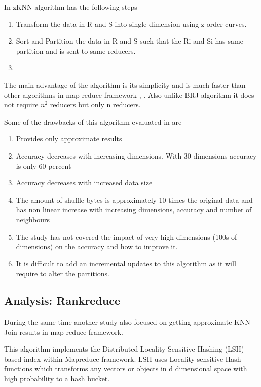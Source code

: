 \documentclass[conference]{IEEEtran}
\begin{document}
\bigskip

In zKNN algorithm has the following steps
\begin{enumerate}
\item Transform the data in R and S into single dimension using z order
  curves.
\item Sort and Partition the data in R and S such that the Ri and Si
  has same partition and is sent to same reducers.
\item
\end{enumerate}

\bigskip

The main advantage of the algorithm is its simplicity and is much
faster than other algorithms in map reduce framework
\cite{lu_efficient_2012},
\cite{stupar_rankreduceprocessing_2010}. Also unlike BRJ algorithm it
does not require $n^2$ reducers but only n reducers.

Some of the drawbacks of this algorithm evaluated in
\cite{song_solutions_2015} are
\begin{enumerate}
\item Provides only approximate results
\item Accuracy decreases with increasing dimensions. With 30 dimensions
  accuracy is only 60 percent
\item Accuracy decreases with increased data size
\item The amount of shuffle bytes is approximately 10 times the
  original data and has non linear increase with increasing dimensions, accuracy and
  number of neighbours
\item The study has not covered the impact of very high dimensions
  (100s of dimensions) on the accuracy and how to improve it.
\item It is difficult to add an incremental updates to this algorithm
  as it will require to alter the partitions.
\end{enumerate}

\bigskip

\subsection{Analysis: Rankreduce}

During the same time another study
\cite{stupar_rankreduceprocessing_2010} also focused on getting
approximate KNN Join results in map reduce framework.

This algorithm implements the Distributed Locality Sensitive Hashing (LSH)
based index within Mapreduce framework. LSH uses Locality sensitive
Hash functions which transforms any vectors or objects in d
dimensional space with high probability to a hash bucket.
\end{document}
